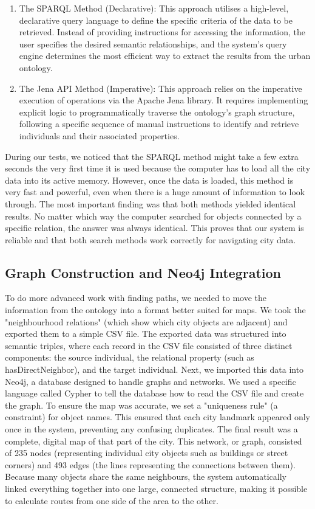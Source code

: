 \documentclass[conference]{IEEEtran}
\begin{document}
\begin{enumerate}
\item The SPARQL Method (Declarative): This approach utilises a high-level, declarative query language to define the specific criteria of the data to be retrieved. Instead of providing instructions for accessing the information, the user specifies the desired semantic relationships, and the system’s query engine determines the most efficient way to extract the results from the urban ontology.
\item The Jena API Method (Imperative): This approach relies on the imperative execution of operations via the Apache Jena library. It requires implementing explicit logic to programmatically traverse the ontology’s graph structure, following a specific sequence of manual instructions to identify and retrieve individuals and their associated properties.
\end{enumerate}
During our tests, we noticed that the SPARQL method might take a few extra seconds the very first time it is used because the computer has to load all the city data into its active memory. However, once the data is loaded, this method is very fast and powerful, even when there is a huge amount of information to look through.
The most important finding was that both methods yielded identical results. No matter which way the computer searched for objects connected by a specific relation, the answer was always identical. This proves that our system is reliable and that both search methods work correctly for navigating city data.

\subsection{Graph Construction and Neo4j Integration}
To do more advanced work with finding paths, we needed to move the information from the ontology into a format better suited for maps. We took the "neighbourhood relations" (which show which city objects are adjacent) and exported them to a simple CSV file. The exported data was structured into semantic triples, where each record in the CSV file consisted of three distinct components: the source individual, the relational property (such as hasDirectNeighbor), and the target individual.
Next, we imported this data into Neo4j, a database designed to handle graphs and networks. We used a specific language called Cypher to tell the database how to read the CSV file and create the graph. To ensure the map was accurate, we set a "uniqueness rule" (a constraint) for object names. This ensured that each city landmark appeared only once in the system, preventing any confusing duplicates.
The final result was a complete, digital map of that part of the city. This network, or graph, consisted of 235 nodes (representing individual city objects such as buildings or street corners) and 493 edges (the lines representing the connections between them). Because many objects share the same neighbours, the system automatically linked everything together into one large, connected structure, making it possible to calculate routes from one side of the area to the other.
\end{document}
